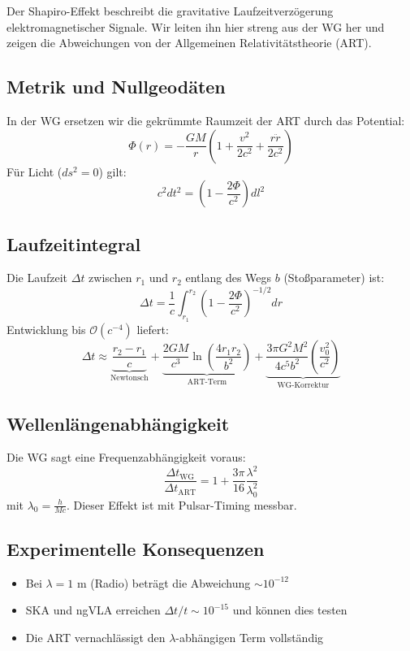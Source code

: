 Der Shapiro-Effekt beschreibt die gravitative Laufzeitverzögerung elektromagnetischer Signale. Wir leiten ihn hier streng aus der WG her und zeigen die Abweichungen von der Allgemeinen Relativitätstheorie (ART).

\subsection{Metrik und Nullgeodäten}
In der WG ersetzen wir die gekrümmte Raumzeit der ART durch das Potential:
\begin{equation}
\Phi(r) = -\frac{GM}{r}\left(1 + \frac{v^2}{2c^2} + \frac{r\ddot{r}}{2c^2}\right)
\end{equation}
Für Licht ($ds^2 = 0$) gilt:
\begin{equation}
c^2dt^2 = \left(1 - \frac{2\Phi}{c^2}\right)dl^2
\end{equation}

\subsection{Laufzeitintegral}
Die Laufzeit $\Delta t$ zwischen $r_1$ und $r_2$ entlang des Wegs $b$ (Stoßparameter) ist:
\begin{equation}
\Delta t = \frac{1}{c}\int_{r_1}^{r_2} \left(1 - \frac{2\Phi}{c^2}\right)^{-1/2} dr
\end{equation}
Entwicklung bis $\mathcal{O}(c^{-4})$ liefert:
\begin{equation}
\Delta t \approx \underbrace{\frac{r_2 - r_1}{c}}_{\text{Newtonsch}} + \underbrace{\frac{2GM}{c^3}\ln\left(\frac{4r_1r_2}{b^2}\right)}_{\text{ART-Term}} + \underbrace{\frac{3\pi G^2M^2}{4c^5b^2}\left(\frac{v_0^2}{c^2}\right)}_{\text{WG-Korrektur}}
\end{equation}

\subsection{Wellenlängenabhängigkeit}
Die WG sagt eine Frequenzabhängigkeit voraus:
\begin{equation}
\frac{\Delta t_{\text{WG}}}{\Delta t_{\text{ART}}} = 1 + \frac{3\pi}{16}\frac{\lambda^2}{\lambda_0^2}
\end{equation}
mit $\lambda_0 = \frac{h}{Mc}$. Dieser Effekt ist mit Pulsar-Timing messbar.

\subsection{Experimentelle Konsequenzen}
\begin{itemize}
\item Bei $\lambda = 1$ m (Radio) beträgt die Abweichung $\sim 10^{-12}$
\item SKA und ngVLA erreichen $\Delta t/t \sim 10^{-15}$ und können dies testen
\item Die ART vernachlässigt den $\lambda$-abhängigen Term vollständig
\end{itemize}

